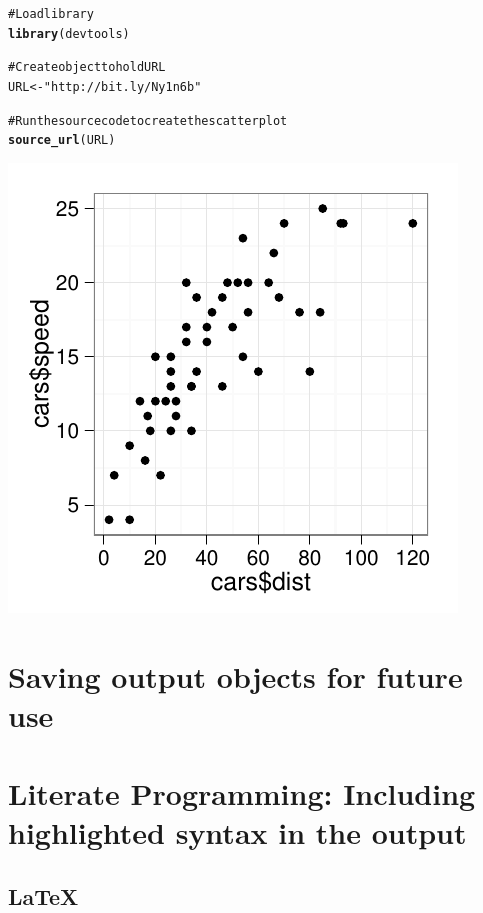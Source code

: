 \documentclass[ChapterTOCs,krantz1]{krantz}\usepackage{graphicx, color}
\makeatletter
\def\maxwidth{ %
  \ifdim\Gin@nat@width>\linewidth
    \linewidth
  \else
    \Gin@nat@width
  \fi
}
\newcommand{\hlfunctioncall}[1]{\textcolor[rgb]{0.501960784313725,0,0.329411764705882}{\textbf{#1}}}%
\newcommand{\hlstring}[1]{\textcolor[rgb]{0.6,0.6,1}{#1}}%
\newcommand{\hlcomment}[1]{\textcolor[rgb]{0.180392156862745,0.6,0.341176470588235}{#1}}%
\newenvironment{kframe}{%
 \def\at@end@of@kframe{}%
 \ifinner\ifhmode%
  \def\at@end@of@kframe{\end{minipage}}%
  \begin{minipage}{\columnwidth}%
 \fi\fi%
 \def\FrameCommand##1{\hskip\@totalleftmargin \hskip-\fboxsep
 \colorbox{shadecolor}{##1}\hskip-\fboxsep
     \hskip-\linewidth \hskip-\@totalleftmargin \hskip\columnwidth}%
 \MakeFramed {\advance\hsize-\width
   \@totalleftmargin\z@ \linewidth\hsize
   \@setminipage}}%
 {\par\unskip\endMakeFramed%
 \at@end@of@kframe}
\newenvironment{knitrout}{}{} %
\makeatother
\begin{document}
\begin{knitrout}
\color{fgcolor}\begin{kframe}
\begin{alltt}
\hlcomment{# Load library}
\hlfunctioncall{library}(devtools)

\hlcomment{# Create object to hold URL}
URL <- \hlstring{"http://bit.ly/Ny1n6b"}

\hlcomment{# Run the source code to create the scatter plot}
\hlfunctioncall{source_url}(URL)
\end{alltt}
\end{kframe}

{\centering \includegraphics[width=\maxwidth]{images8/Ch8SourceURLExample} 

}


\end{knitrout}


\section{Saving output objects for future use}

\section{Literate Programming: Including highlighted syntax in the output}

\subsection{\LaTeX}
\end{document}
